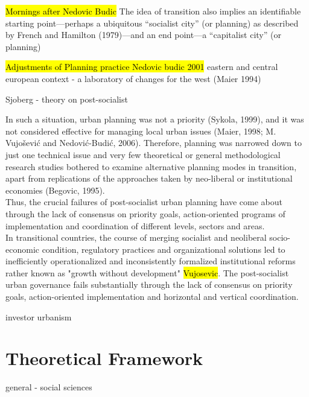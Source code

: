 \documentclass[11pt]{report}
\begin{document}
\hl{Mornings after Nedovic Budic}
The idea of transition also implies an identiﬁable starting point—perhaps a ubiquitous “socialist city” (or planning) as described by French and Hamilton (1979)—and an end point—a “capitalist city” (or planning)

\hl{Adjustments of Planning practice Nedovic budic 2001}
eastern and central european context - a laboratory of changes for the west (Maier 1994)

Sjoberg - theory on post-socialist

In such a situation, urban planning was not a priority (Sykola, 1999), and it was not considered effective for managing local urban issues (Maier, 1998; M. Vujošević and Nedović-Budić, 2006). Therefore, planning was narrowed down to just one technical issue and very few theoretical or general methodological research studies bothered to examine alternative planning modes in transition, apart from replications of the approaches taken by neo-liberal or institutional economies (Begovic, 1995).
\\
Thus, the crucial failures of post-socialist urban planning have come about through the lack of consensus on priority goals, action-oriented programs of implementation and coordination of different levels, sectors and areas. 
\\
In transitional countries, the course of merging socialist and neoliberal socio-economic condition, regulatory practices and organizational solutions led to inefficiently operationalized and inconsistently formalized institutional reforms rather known as "growth without development" \hl{Vujosevic}.
The post-socialist urban governance fails substantially through the lack of consensus on priority goals, action-oriented implementation and horizontal and vertical coordination.
\\

investor urbanism

\section{Theoretical Framework}

general - social sciences
\end{document}
